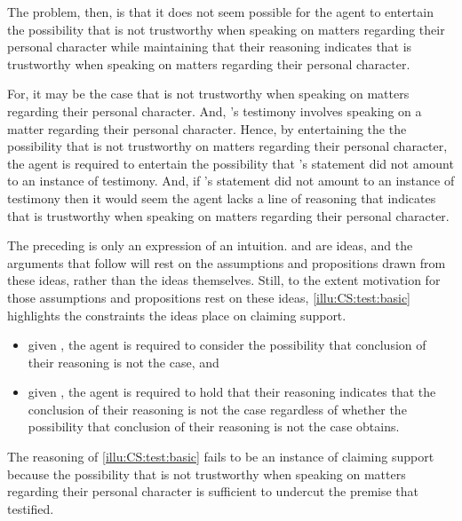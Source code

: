 \begin{note}
  The problem, then, is that it does not seem possible for the agent to entertain the possibility that  is not trustworthy when speaking on matters regarding their personal character while maintaining that their reasoning indicates that  is trustworthy when speaking on matters regarding their personal character.

  For, it may be the case that  is not trustworthy when speaking on matters regarding their personal character.
  And, 's testimony involves speaking on a matter regarding their personal character.
  Hence, by entertaining the the possibility that  is not trustworthy on matters regarding their personal character, the agent is required to entertain the possibility that 's statement did not amount to an instance of testimony.
  And, if 's statement did not amount to an instance of testimony then it would seem the agent lacks a line of reasoning that indicates that  is trustworthy when speaking on matters regarding their personal character.
\end{note}

\begin{note}
  The preceding is only an expression of an intuition.
  \ideaCSA{} and \ideaCSB{} are ideas, and the arguments that follow will rest on the assumptions and propositions drawn from these ideas, rather than the ideas themselves.
  Still, to the extent motivation for those assumptions and propositions rest on these ideas, \autoref{illu:CS:test:basic} highlights the constraints the ideas place on claiming support.

  \begin{itemize}
  \item given \ideaCSA{}, the agent is required to consider the possibility that conclusion of their reasoning is not the case, and
  \item given \ideaCSB{}, the agent is required to hold that their reasoning indicates that the conclusion of their reasoning is not the case regardless of whether the possibility that conclusion of their reasoning is not the case obtains.
  \end{itemize}
  The reasoning of \autoref{illu:CS:test:basic} fails to be an instance of claiming support because the possibility that  is not trustworthy when speaking on matters regarding their personal character is sufficient to undercut the premise that  testified.
\end{note}

